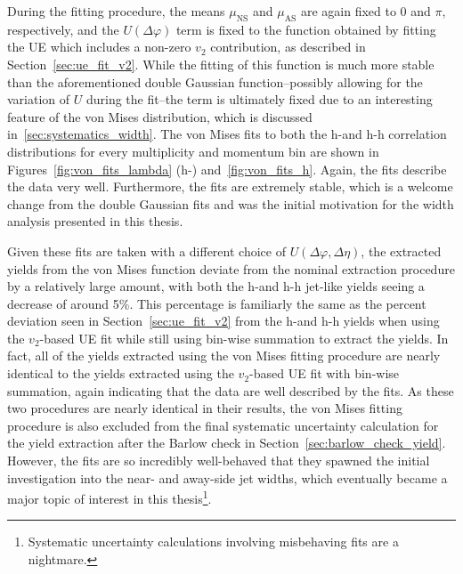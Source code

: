 During the fitting procedure, the means $\mu_{\text{NS}}$ and $\mu_{\text{AS}}$ are again fixed to 0 and $\pi$, respectively, and the $U(\Delta\varphi)$ term is fixed to the function obtained by fitting the UE which includes a non-zero $v_{2}$ contribution, as described in Section~\ref{sec:ue_fit_v2}. While the fitting of this function is much more stable than the aforementioned double Gaussian function--possibly allowing for the variation of $U$ during the fit--the term is ultimately fixed due to an interesting feature of the von Mises distribution, which is discussed in~\ref{sec:systematics_width}. The von Mises fits to both the h-\lmb and h-h correlation distributions for every multiplicity and momentum bin are shown in Figures~\ref{fig:von_fits_lambda} (h-\lmb) and~\ref{fig:von_fits_h}. Again, the fits describe the data very well. Furthermore, the fits are extremely stable, which is a welcome change from the double Gaussian fits and was the initial motivation for the width analysis presented in this thesis.

Given these fits are taken with a different choice of $U(\Delta\varphi, \Delta\eta)$, the extracted yields from the von Mises function deviate from the nominal extraction procedure by a relatively large amount, with both the h-\lmb and h-h jet-like yields seeing a decrease of around 5\%. This percentage is familiarly the same as the percent deviation seen in Section~\ref{sec:ue_fit_v2} from the h-\lmb and h-h yields when using the $v_{2}$-based UE fit while still using bin-wise summation to extract the yields.  In fact, all of the yields extracted using the von Mises fitting procedure are nearly identical to the yields extracted using the $v_{2}$-based UE fit with bin-wise summation, again indicating that the data are well described by the fits. As these two procedures are nearly identical in their results, the von Mises fitting procedure is also excluded from the final systematic uncertainty calculation for the yield extraction after the Barlow check in Section~\ref{sec:barlow_check_yield}. However, the fits are so incredibly well-behaved that they spawned the initial investigation into the near- and away-side jet widths, which eventually became a major topic of interest in this thesis\footnote{Systematic uncertainty calculations involving misbehaving fits are a nightmare.}.

